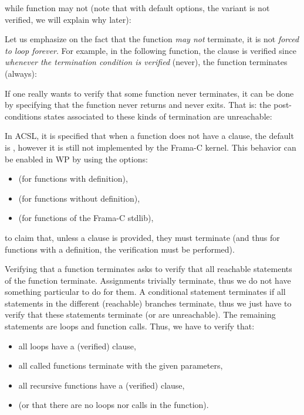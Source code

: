 while function  may not (note that with default options,
the variant is not verified, we will explain why later):




Let us emphasize on the fact that the function {\em may not} terminate, it is
not {\em forced to loop forever}. For example, in the following function, the
 clause is verified since
{\em whenever the termination condition is verified} (never), the function
terminates (always):




\begin{Information}
  If one really wants to verify that some function never terminates, it can be
  done by specifying that the function never returns and never exits. That is:
  the post-conditions states associated to these kinds of termination are
  unreachable:
\end{Information}


\begin{Information}
  In ACSL, it is specified that when a function does not have a
   clause, the default is
  , however it is still not
  implemented by the Frama-C kernel. This behavior can be enabled in WP
  by using the options:
  \begin{itemize}
  \item {} (for functions with definition),
  \item {} (for functions without definition),
  \item {} (for functions of the Frama-C stdlib),
  \end{itemize}
  to claim that, unless a clause is provided, they must terminate (and thus
  for functions with a definition, the verification must be performed).
\end{Information}




Verifying that a function terminates asks to verify that all reachable
statements of the function terminate. Assignments trivially terminate, thus
we do not have something particular to do for them. A conditional statement
terminates if all statements in the different (reachable) branches terminate,
thus we just have to verify that these statements terminate (or are unreachable).
The remaining statements are loops and function calls. Thus, we have to verify
that:
\begin{itemize}
  \item all loops have a (verified)  clause,
  \item all called functions terminate with the given parameters,
  \item all recursive functions have a (verified)  clause,
  \item (or that there are no loops nor calls in the function).
\end{itemize}


